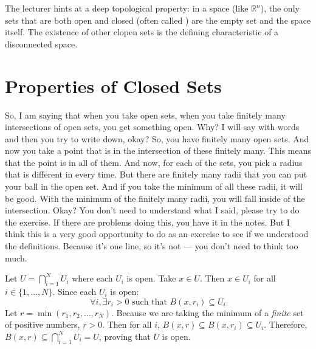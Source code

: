 \begin{didactic-insight}
The lecturer hints at a deep topological property: in a  space (like $\mathbb{R}^n$), the only sets that are both open and closed (often called ) are the empty set and the space itself. The existence of other clopen sets is the defining characteristic of a disconnected space.
\end{didactic-insight}

\section{Properties of Closed Sets}

\begin{spoken-clean}[00:19:15 - 00:21:15]
So, I am saying that when you take open sets, when you take finitely many intersections of open sets, you get something open. Why? I will say with words and then you try to write down, okay? So, you have finitely many open sets. And now you take a point that is in the intersection of these finitely many. This means that the point is in all of them. And now, for each of the sets, you pick a radius that is different in every time. But there are finitely many radii that you can put your ball in the open set. And if you take the minimum of all these radii, it will be good. With the minimum of the finitely many radii, you will fall inside of the intersection. Okay? You don't need to understand what I said, please try to do the exercise. If there are problems doing this, you have it in the notes. But I think this is a very good opportunity to do as an exercise to see if we understood the definitions. Because it's one line, so it's not --- you don't need to think too much.
\end{spoken-clean}

\begin{math-stroke}
\begin{ai-proof-skeleton-invisible-content}
\end{ai-proof-skeleton-invisible-content}
\begin{short-proof}
Let $U = \bigcap_{i=1}^N U_i$ where each $U_i$ is open. Take $x \in U$.
Then $x \in U_i$ for all $i \in \{1, \dots, N\}$. Since each $U_i$ is open:
\[ \forall i, \exists r_i > 0 \text{ such that } B(x, r_i) \subseteq U_i \]
Let $r = \min(r_1, r_2, \dots, r_N)$. Because we are taking the minimum of a \emph{finite} set of positive numbers, $r > 0$.
Then for all $i$, $B(x, r) \subseteq B(x, r_i) \subseteq U_i$.
Therefore, $B(x, r) \subseteq \bigcap_{i=1}^N U_i = U$, proving that $U$ is open.
\end{short-proof}
\end{math-stroke}

